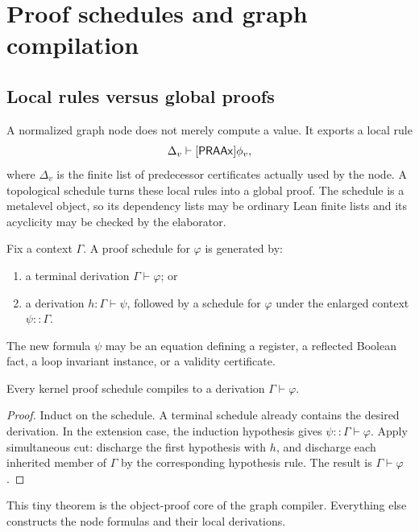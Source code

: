 \section{Proof schedules and graph compilation}\label{sec:graph}

\subsection{Local rules versus global proofs}

A normalized graph node does not merely compute a value.  It exports a local rule
\[
  \Delta_v\vdash[\mathsf{PRAAx}]\phi_v,
\]
where \(\Delta_v\) is the finite list of predecessor certificates actually used by the node.  A topological schedule turns these local rules into a global proof.  The schedule is a metalevel object, so its dependency lists may be ordinary Lean finite lists and its acyclicity may be checked by the elaborator.

\begin{definition}
Fix a context \(\Gamma\).  A proof schedule for \(\varphi\) is generated by:
\begin{enumerate}[label=(\roman*)]
  \item a terminal derivation \(\Gamma\vdash\varphi\); or
  \item a derivation \(h:\Gamma\vdash\psi\), followed by a schedule for \(\varphi\) under the enlarged context \(\psi::\Gamma\).
\end{enumerate}
The new formula \(\psi\) may be an equation defining a register, a reflected Boolean fact, a loop invariant instance, or a validity certificate.
\end{definition}

\begin{theorem}\label{thm:schedule}
Every kernel proof schedule compiles to a derivation \(\Gamma\vdash\varphi\).
\end{theorem}

\begin{proof}
Induct on the schedule.  A terminal schedule already contains the desired derivation.  In the extension case, the induction hypothesis gives \(\psi::\Gamma\vdash\varphi\).  Apply simultaneous cut: discharge the first hypothesis with \(h\), and discharge each inherited member of \(\Gamma\) by the corresponding hypothesis rule.  The result is \(\Gamma\vdash\varphi\).
\end{proof}

This tiny theorem is the object-proof core of the graph compiler.  Everything else constructs the node formulas and their local derivations.

